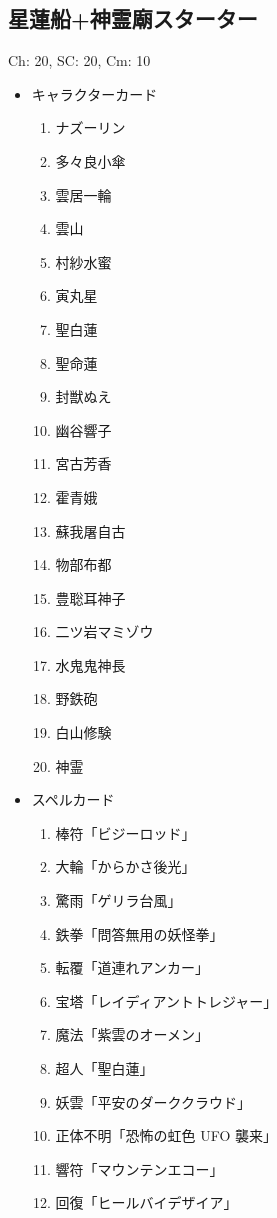 \documentclass[line_length=22zw,number_of_lines=45,twocolumn]{jlreq}
\begin{document}
\subsection{星蓮船+神霊廟スターター}
Ch: 20, SC: 20, Cm: 10
\begin{itemize}
	\item キャラクターカード
		\begin{enumerate}
			\item ナズーリン
			\item 多々良小傘
			\item 雲居一輪
			\item 雲山
			\item 村紗水蜜
			\item 寅丸星
			\item 聖白蓮
			\item 聖命蓮
			\item 封獣ぬえ
			\item 幽谷響子
			\item 宮古芳香
			\item 霍青娥
			\item 蘇我屠自古
			\item 物部布都
			\item 豊聡耳神子
			\item 二ツ岩マミゾウ
			\item 水鬼鬼神長
			\item 野鉄砲
			\item 白山修験
			\item 神霊
		\end{enumerate}
	\item スペルカード
		\begin{enumerate}
			\item 棒符「ビジーロッド」
			\item 大輪「からかさ後光」
			\item 驚雨「ゲリラ台風」
			\item 鉄拳「問答無用の妖怪拳」
			\item 転覆「道連れアンカー」
			\item 宝塔「レイディアントトレジャー」
			\item 魔法「紫雲のオーメン」
			\item 超人「聖白蓮」
			\item 妖雲「平安のダーククラウド」
			\item 正体不明「恐怖の虹色 UFO 襲来」
			\item 響符「マウンテンエコー」
			\item 回復「ヒールバイデザイア」

\end{enumerate}
\end{itemize}
\end{document}
